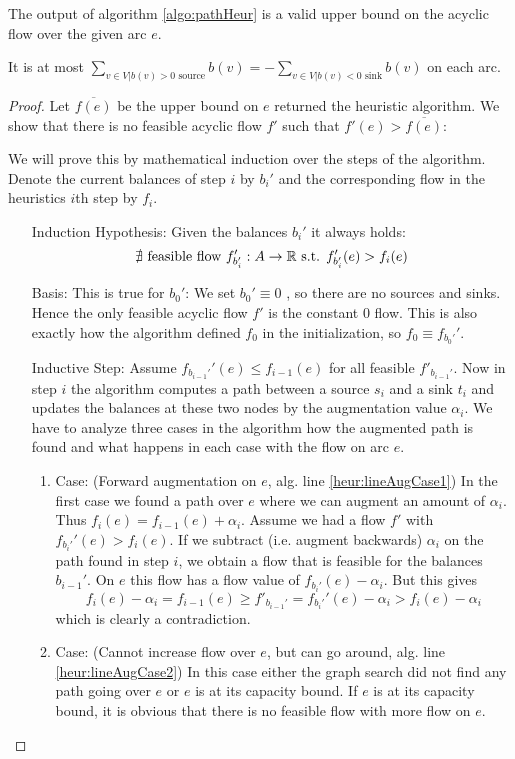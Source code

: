 \begin{prop}
 The output of algorithm \ref{algo:pathHeur} is a valid upper bound on the acyclic flow over the given arc $e$. 
 
 It is at most $\sum_{v\in V|b(v)>0\textrm{ source}}b(v)=-\sum_{v\in V|b(v)<0\textrm{ sink}}b(v)$ on each arc.
\end{prop}
\begin{proof}
  Let $\overline{f(e)}$ be the upper bound on $e$ returned the heuristic algorithm. We show that there is no feasible 
  acyclic flow $f'$ such that $f'(e)>\overline{f(e)}$:
  
  We will prove this by mathematical induction over the steps of the algorithm. Denote the current balances of step $i$ 
  by $b_i'$ and the corresponding flow in the heuristics $i$th step by $f_i$.
  \begin{itemize}
   \item[Induction Hypothesis:] Given the balances $b_i'$ it always holds: 
      $$\nexists \textrm{ feasible flow }f_{b_i'}':A\to \mathbb{R}\textrm{ s.t. }f'_{b_i'}(e) > f_i(e)$$
   \item[Basis:] This is true for $b_0'$: We set $b_0'\equiv 0$ , so there are no sources and sinks. Hence the only 
      feasible acyclic flow $f'$ is the constant $0$ flow. This is also exactly how the algorithm defined $f_0$ in the 
      initialization, so $f_0\equiv f_{b_0'}'$.
   \item[Inductive Step:] Assume $f_{b_{i-1}'}'(e)\le f_{i-1}(e)$ for all feasible $f'_{b_{i-1}'}$. Now in step $i$ the 
      algorithm computes a path between a source $s_i$ and a sink $t_i$ and updates the balances at these two nodes by 
      the augmentation value $\alpha_i$.
      We have to analyze three cases in the algorithm how the augmented path is found and what happens in each case 
      with the flow on arc $e$.
      \begin{enumerate}
       \item Case: (Forward augmentation on $e$, alg. line \ref{heur:lineAugCase1}) In the first case we found a path 
	  over $e$ where we can augment an amount of $\alpha_i$. Thus $f_i(e)=f_{i-1}(e)+\alpha_i$. 
	  Assume we had a flow $f'$ with $f_{b_{i}'}'(e)> f_{i}(e)$. If we subtract (i.e. augment backwards) $\alpha_i$
	  on the path found in step $i$, we obtain a flow that is feasible for the balances $b_{i-1}'$. On $e$ this 
	  flow has a flow value of $f_{b_i'}(e)-\alpha_i$. But this gives 
	  $$f_i(e)-\alpha_i =f_{i-1}(e)\ge f'_{b_{i-1}'}= f_{b_i'}'(e)-\alpha_i > f_{i}(e)-\alpha_i$$
	  which is clearly a contradiction. \Lightning
       \item Case: (Cannot increase flow over $e$, but can go around, alg. line \ref{heur:lineAugCase2}) 
	  In this case either the graph search did not find any path going over $e$ or $e$ is at its capacity bound. 
	  If $e$ is at its capacity bound, it is obvious that there is no feasible flow with more flow on $e$.
	  

\end{enumerate}
\end{itemize}
\end{proof}
